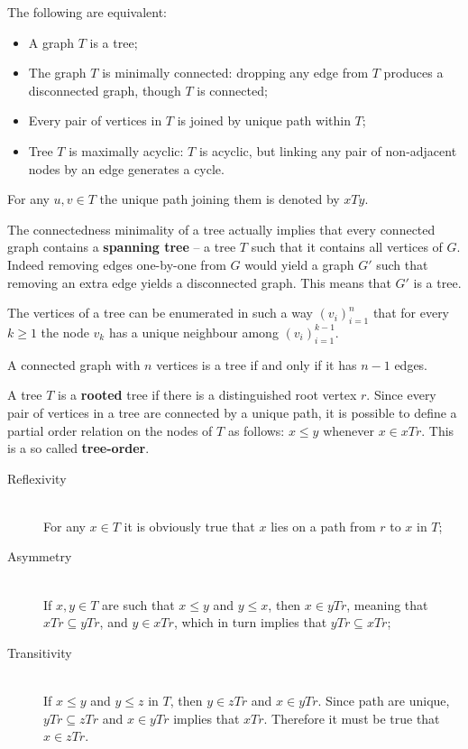 \documentclass[a4paper]{article}
\newcommand{\brac}[1]{{\left ( #1 \right )}}
\begin{document}
The following are equivalent:
\begin{itemize}
	\item A graph $T$ is a tree;
	\item The graph $T$ is minimally connected: dropping any edge from $T$ produces a disconnected graph, though $T$ is connected;
	\item Every pair of vertices in $T$ is joined by unique path within $T$;
	\item Tree $T$ is maximally acyclic: $T$ is acyclic, but linking any pair of non-adjacent nodes by an edge generates a cycle.
\end{itemize}

For any $u,v\in T$ the unique path joining them is denoted by $xTy$.

The connectedness minimality of a tree actually implies that every
connected graph contains a \textbf{spanning tree} -- a tree $T$ such
that it contains all vertices of $G$.
Indeed removing edges one-by-one from $G$ would yield a graph $G'$
such that removing an extra edge yields a disconnected graph.
This means that $G'$ is a tree.

The vertices of a tree can be enumerated in such a way
$\brac{v_i}_{i=1}^n$ that for every $k\geq 1$ the node $v_k$ has
a unique neighbour among $\brac{v_i}_{i=1}^{k-1}$.

A connected graph with $n$ vertices is a tree if and only if it has
$n-1$ edges.

A tree $T$ is a \textbf{rooted} tree if there is a distinguished
root vertex $r$.
Since every pair of vertices in a tree are connected by a unique
path, it is possible to define a partial order relation on the nodes
of $T$ as follows: $x\leq y$ whenever $x\in xTr$.
This is a so called \textbf{tree-order}.
\begin{description}
	\item[Reflexivity] \hfill \\
		For any $x\in T$ it is obviously true that $x$ lies on a
		path from $r$ to $x$ in $T$;
	\item[Asymmetry] \hfill \\
		If $x,y\in T$ are such that $x\leq y$ and $y\leq x$, then
		$x\in yTr$, meaning that $xTr\subseteq yTr$, and $y\in xTr$, 
		which in turn implies that $yTr\subseteq xTr$;
	\item[Transitivity] \hfill \\
		If $x\leq y$ and $y\leq z$ in $T$, then $y\in zTr$ and
		$x\in yTr$. Since path are unique, $yTr\subseteq zTr$ and
		$x\in yTr$ implies that $xTr$. Therefore it must be true
		that $x\in zTr$.
\end{description}
\end{document}
